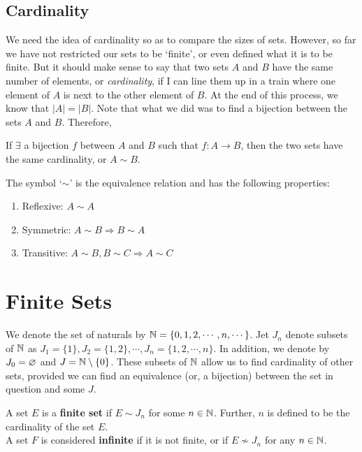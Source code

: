\subsection{Cardinality}
We need the idea of cardinality so as to compare the sizes of sets. However, so far we have not restricted our sets to be `finite', or even defined what it is to be finite. But it should make sense to say that two sets $A$ and $B$ have the same number of elements, or \textit{cardinality}, if I can line them up in a train where one element of $A$ is next to the other element of $B$. At the end of this process, we know that $|A|=|B|$. Note that what we did was to find a bijection between the sets $A$ and $B$.
Therefore,
\begin{definition}
If $\exists$ a bijection $f$ between $A$ and $B$ such that $f:A\rightarrow B$, then the two sets have the same cardinality, or $A\sim B$.
\end{definition}
The symbol `$\sim$' is the equivalence relation and has the following properties:
\begin{enumerate}[label=(\alph*)]
\item Reflexive: $A\sim A$
\item Symmetric: $A\sim B\Rightarrow B\sim A$
\item Transitive: $A\sim B, B\sim C\Rightarrow A\sim C$
\end{enumerate}

\section{Finite Sets}
We denote the set of naturals by $\mathbb{N}=\{0,1,2,\cdots,n,\cdots\}$. Jet $J_n$ denote subsets of $\mathbb{N}$ as $J_1=\{1\}, J_2=\{1,2\},\cdots, J_n=\{1,2,\cdots,n\}$. In addition, we denote by $J_0=\varnothing$ and $J=\mathbb{N}\setminus \{0\}$. These subsets of $\mathbb{N}$ allow us to find cardinality of other sets, provided we can find an equivalence (or, a bijection) between the set in question and some $J$.
\begin{definition}
A set $E$ is a \textbf{finite set} if $E\sim J_n$ for some $n\in \mathbb{N}$. Further, $n$ is defined to be the cardinality of the set $E$.\\
A set $F$ is considered \textbf{infinite} if it is not finite, or if $E\nsim J_n$ for any $n\in \mathbb{N}$.
\end{definition}

